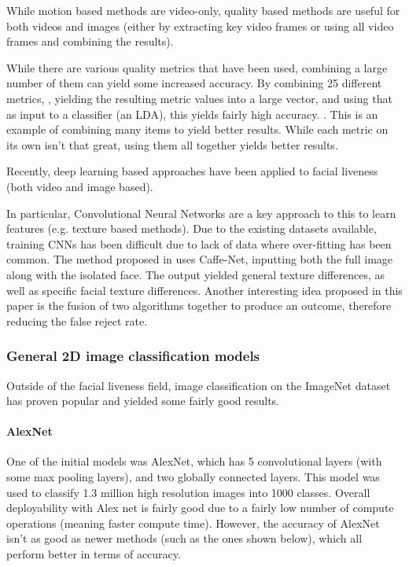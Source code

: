 \documentclass[10pt,a4paper]{article}
\begin{document}
        While motion based methods are video-only, quality based methods are useful for both videos and images (either by extracting key video frames or using all video frames and combining the results).

        While there are various quality metrics that have been used, combining a large number of them can yield some increased accuracy. By combining 25 different metrics,
        , yielding the resulting metric values into a large vector, and using that as input to a classifier (an LDA), this yields fairly high accuracy. \cite{ImageQualityAssessmentTest}.
        This is an example of combining many items to yield better results. While each metric on its own isn't that great, using them all together yields better results.
        
        Recently, deep learning based approaches have been applied to facial liveness (both video and image based).

        In particular, Convolutional Neural Networks are a key approach to this to learn features (e.g. texture based methods).
        Due to the existing datasets available, training CNNs has been difficult due to lack of data where over-fitting has been common.
        The method proposed in \cite{Patel2016CrossDatabaseFA} uses Caffe-Net, inputting both the full image along with the isolated face.
        The output yielded general texture differences, as well as specific facial texture differences. Another interesting idea proposed
        in this paper is the fusion of two algorithms together to produce an outcome, therefore reducing the false reject rate.
        
        \subsubsection{General 2D image classification models}
        Outside of the facial liveness field, image classification on the ImageNet dataset has proven popular and yielded some fairly good
        results. 
        
        \paragraph{AlexNet} 
        One of the initial models was AlexNet, which has 5 convolutional layers (with some max pooling layers), and two globally connected layers.
        This model was used to classify 1.3 million high resolution images into 1000 classes. \cite{AlexNet} Overall deployability
        with Alex net is fairly good due to a fairly low number of compute operations (meaning faster compute time). \cite{DeepNeuralNetworkDeployability} However, the accuracy of AlexNet isn't
        as good as newer methods (such as the ones shown below), which all perform better in terms of accuracy. 
        
\end{document}
